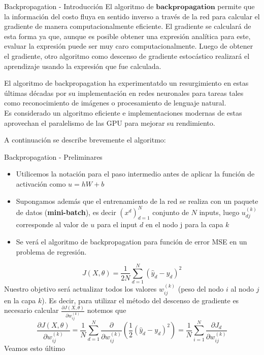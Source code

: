 \documentclass[handout, 9pt]{beamer}
\begin{document}
\begin{frame}{Backpropagation - Introducción}
El algoritmo de $\textbf{backpropagation}$ permite que la información del costo fluya en sentido inverso a través de la red para calcular el gradiente de manera computacionalmente eficiente.  \pause 
El gradiente se calculará de esta forma ya que, aunque es posible obtener una expresión analítica para este, evaluar la expresión puede ser muy caro computacionalmente. 
\pause Luego de obtener el gradiente, otro algoritmo como descenso de gradiente estocástico realizará el aprendizaje usando la expresión que fue calculada. \pause

\vspace{0.2cm}

El algoritmo de backpropagation ha experimentatdo un resurgimiento en estas últimas décadas por su implementación en redes neuronales para tareas tales como reconocimiento de imágenes o procesamiento de lenguaje natural. \\
Es considerado un algoritmo eficiente e implementaciones modernas de estas aprovechan el paralelismo de las GPU para mejorar su rendimiento. \pause

A continuación se describe brevemente el algoritmo: 

\end{frame}

\begin{frame}{Backpropagation - Preliminares}

\begin{itemize}
  \item Utilicemos la notación para el paso intermedio antes de aplicar la función de activación como $u = hW + b$ \pause

  \item Supongamos además que el entrenamiento de la red se realiza con un paquete de datos (\textbf{mini-batch}), es decir $(x^d)_{d=1}^N$  conjunto de $N$ inputs, luego $u_{dj}^{(k)}$ corresponde al valor de $u$ para el input $d$ en el nodo j para la capa $k$ \pause
 
 \item Se verá el algoritmo de backpropagation para función de error MSE en un problema de regresión.  \pause

\end{itemize} 
\[
J(X , \theta) = \frac{1}{2N}\sum_{d=1}^N(\hat{y}_d-y_d)^2
\]
Nuestro objetivo será actualizar todos los valores $w_{ij}^{(k)}$ (peso del nodo $i$ al nodo $j$ en la capa $k$). Es decir, para utilizar el método del descenso de gradiente es necesario calcular $\frac{\partial J(X , \theta) }{\partial w_{ij}^{(k)}}$ notemos que \pause
\[
\frac{\partial J(X , \theta) }{\partial w_{ij}^{(k)}} = \frac{1}{N}\sum_{d=1}^N \frac{\partial}{\partial w_{ij}^{(k)}} \left ( \frac{1}{2}(\hat{y}_d-y_d)^2 \right) = \frac{1}{N}\sum_{i=1}^N \frac{\partial J_d}{\partial w_{ij}^{(k)}}
\]
Veamos esto último
\end{frame}
\end{document}

